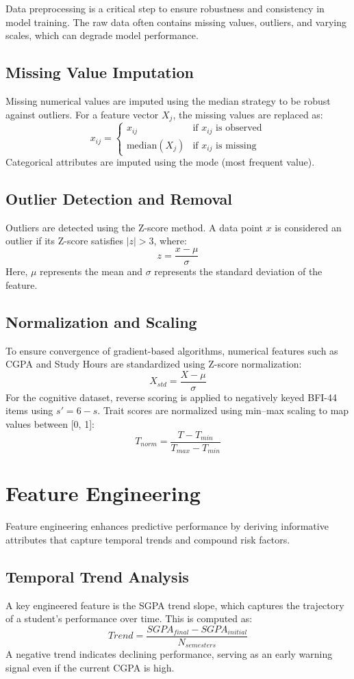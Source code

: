 \documentclass[12pt,a4paper]{report}
\begin{document}
Data preprocessing is a critical step to ensure robustness and consistency in model training. The raw data often contains missing values, outliers, and varying scales, which can degrade model performance.

\subsection{Missing Value Imputation}
Missing numerical values are imputed using the median strategy to be robust against outliers. For a feature vector $X_j$, the missing values are replaced as:
\[
x_{ij} = \begin{cases} 
x_{ij} & \text{if } x_{ij} \text{ is observed} \\
\text{median}(X_j) & \text{if } x_{ij} \text{ is missing}
\end{cases}
\]
Categorical attributes are imputed using the mode (most frequent value).

\subsection{Outlier Detection and Removal}
Outliers are detected using the Z-score method. A data point $x$ is considered an outlier if its Z-score satisfies $|z| > 3$, where:
\[
z = \frac{x - \mu}{\sigma}
\]
Here, $\mu$ represents the mean and $\sigma$ represents the standard deviation of the feature.

\subsection{Normalization and Scaling}
To ensure convergence of gradient-based algorithms, numerical features such as CGPA and Study Hours are standardized using Z-score normalization:
\[
X_{std} = \frac{X - \mu}{\sigma}
\]
For the cognitive dataset, reverse scoring is applied to negatively keyed BFI-44 items using $s' = 6 - s$. Trait scores are normalized using min–max scaling to map values between [0, 1]:
\[
T_{norm} = \frac{T - T_{min}}{T_{max} - T_{min}}
\]

\section{Feature Engineering}

Feature engineering enhances predictive performance by deriving informative attributes that capture temporal trends and compound risk factors.

\subsection{Temporal Trend Analysis}
A key engineered feature is the SGPA trend slope, which captures the trajectory of a student's performance over time. This is computed as:
\[
Trend = \frac{SGPA_{final} - SGPA_{initial}}{N_{semesters}}
\]
A negative trend indicates declining performance, serving as an early warning signal even if the current CGPA is high.
\end{document}
